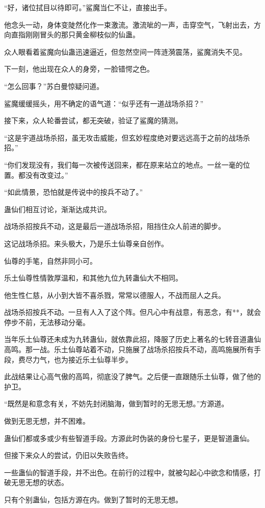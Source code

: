 \begin{this_body}
“好，诸位拭目以待即可。”鲨魔当仁不让，直接出手。

他念头一动，身体变陡然化作一束激流。激流呲的一声，击穿空气，飞射出去，方向直指刚刚冒头的那只黄金柳枝似的仙蛊。

众人眼看着鲨魔向仙蛊迅速逼近，但忽然空间一阵涟漪震荡，鲨魔消失不见。

下一刻，他出现在众人的身旁，一脸错愕之色。

“怎么回事？”苏白曼惊疑问道。

鲨魔缓缓摇头，用不确定的语气道：“似乎还有一道战场杀招？”

接下来，众人轮番尝试，都无突破，验证了鲨魔的猜测。

“这是宇道战场杀招，虽无攻击威能，但玄妙程度绝对要远远高于之前的战场杀招。”

“你们发现没有，我们每一次被传送回来，都在原来站立的地点。一丝一毫的位置。都没有改变过。”

“如此情景，恐怕就是传说中的按兵不动了。”

蛊仙们相互讨论，渐渐达成共识。

战场杀招按兵不动，这是最后一道战场杀招，阻挡住众人前进的脚步。

这记战场杀招。来头极大，乃是乐土仙尊亲自创作。

仙尊的手笔，自然非同小可。

乐土仙尊性情敦厚温和，和其他九位九转蛊仙大不相同。

他生性仁慈，从小到大皆不喜杀戮，常常以德服人，不战而屈人之兵。

战场杀招按兵不动。一旦有人入了这个阵。但凡心中有战意，有恶念，有**，就会停步不前，无法移动分毫。

当年乐土仙尊还未成为九转蛊仙，就依靠此招，降服了历史上著名的七转音道蛊仙高鸣。那一战。乐土仙尊站着不动，只施展了战场杀招按兵不动，高鸣施展所有手段，费尽力气，也为接近乐土仙尊半步。

此战结果让心高气傲的高鸣，彻底没了脾气。之后便一直跟随乐土仙尊，做了他的护卫。

“既然是和意念有关，不妨先封闭脑海，做到暂时的无思无想。”方源道。

做到无思无想，并不困难。

蛊仙们都或多或少有些智道手段。方源此时伪装的身份七星子，更是智道蛊仙。

但接下来众人的尝试，仍旧以失败告终。

一些蛊仙的智道手段，并不出色。在前行的过程中，就被勾起心中欲念和情感，打破无思无想的状态。

只有个别蛊仙，包括方源在内。做到了暂时的无思无想。


\end{this_body}
